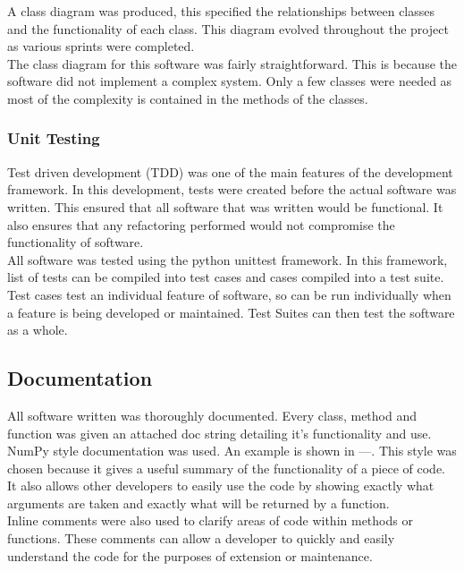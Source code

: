 \documentclass{article}
\begin{document}
A class diagram was produced, this specified the relationships between classes and the functionality of each class. This diagram evolved throughout the project as various sprints were completed.\\

The class diagram for this software was fairly straightforward. This is because the software did not implement a complex system. Only a few classes were needed as most of the complexity is contained in the methods of the classes.

\subsubsection{Unit Testing}
Test driven development (TDD) was one of the main features of the development framework. In this development, tests were created before the actual software was written. This ensured that all software that was written would be functional. It also ensures that any refactoring performed would not compromise the functionality of software.\\

All software was tested using the python unittest framework. In this framework, list of tests can be compiled into test cases and cases compiled into a test suite. Test cases test an individual feature of software, so can be run individually when a feature is being developed or maintained. Test Suites can then test the software as a whole.\\

\subsection{Documentation}
All software written was thoroughly documented. Every class, method and function was given an attached doc string detailing it's functionality and use.\\

NumPy style documentation was used. An example is shown in ---. This style was chosen because it gives a useful summary of the functionality of a piece of code. It also allows other developers to easily use the code by showing exactly what arguments are taken and exactly what will be returned by a function.\\

Inline comments were also used to clarify areas of code within methods or functions. These comments can allow a developer to quickly and easily understand the code for the purposes of extension or maintenance. 
\end{document}
